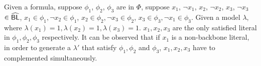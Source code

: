 

\begin{example}
Given a formula, suppose $\phi_1$, $\phi_2$, $\phi_3$ are in $\Phi$, suppose $x_1$, $\neg x_1$, $x_2$, $\neg x_2$, $x_3$, $\neg x_3$ $\in{\sf \widehat{BL}}$, $x_1\in\phi_1, \neg x_2\in\phi_1$, $x_2\in\phi_2, \neg x_3\in\phi_2$, $x_3\in\phi_3, \neg x_1\in\phi_3$.
Given a model $\lambda$, where $\lambda(x_1)=1, \lambda(x_2)=1, \lambda(x_3)=1$. $x_1, x_2, x_3$ are the only satisfied literal in $\phi_1, \phi_2, \phi_3$ respectively.
It can be observed that if $x_1$ is a non-backbone literal, in order to generate a $\lambda'$ that satisfy $\phi_1, \phi_2$ and $\phi_3$, $x_1, x_2, x_3$ have to complemented simultaneously.
\end{example}

